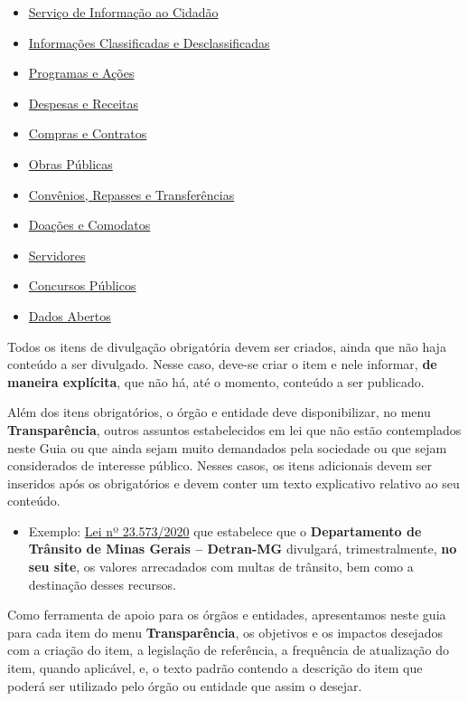 \documentclass[
]{book}
\providecommand{\tightlist}{%
  \setlength{\itemsep}{0pt}\setlength{\parskip}{0pt}}
\begin{document}
\begin{itemize}
\tightlist
\item
  \href{servico-informacao.html}{Serviço de Informação ao Cidadão}
\item
  \href{informacoes-classificadas.html}{Informações Classificadas e Desclassificadas}
\item
  \href{programas-acoes.html}{Programas e Ações}
\item
  \href{despesas-receitas.html}{Despesas e Receitas}
\item
  \href{compras-contratos.html}{Compras e Contratos}
\item
  \href{obras-publicas.html}{Obras Públicas}
\item
  \href{convenios-repasses.html}{Convênios, Repasses e Transferências}
\item
  \href{doacoes.html}{Doações e Comodatos}
\item
  \href{servidores.html}{Servidores}
\item
  \href{concursos-publicos.html}{Concursos Públicos}
\item
  \href{dados-abertos.html}{Dados Abertos}
\end{itemize}

Todos os itens de divulgação obrigatória devem ser criados, ainda que não haja conteúdo a ser divulgado. Nesse caso, deve-se criar o item e nele informar, \textbf{de maneira explícita}, que não há, até o momento, conteúdo a ser publicado.

Além dos itens obrigatórios, o órgão e entidade deve disponibilizar, no menu \textbf{Transparência}, outros assuntos estabelecidos em lei que não estão contemplados neste Guia ou que ainda sejam muito demandados pela sociedade ou que sejam considerados de interesse público. Nesses casos, os itens adicionais devem ser inseridos após os obrigatórios e devem conter um texto explicativo relativo ao seu conteúdo.

\begin{itemize}
\tightlist
\item
  Exemplo: \href{https://www.almg.gov.br/consulte/legislacao/completa/completa.html?tipo=LEI\&num=23573\&comp=\&ano=2020}{Lei nº 23.573/2020} que estabelece que o \textbf{Departamento de Trânsito de Minas Gerais -- Detran-MG} divulgará, trimestralmente, \textbf{no seu site}, os valores arrecadados com multas de trânsito, bem como a destinação desses recursos.
\end{itemize}

Como ferramenta de apoio para os órgãos e entidades, apresentamos neste guia para cada item do menu \textbf{Transparência}, os objetivos e os impactos desejados com a criação do item, a legislação de referência, a frequência de atualização do item, quando aplicável, e, o texto padrão contendo a descrição do item que poderá ser utilizado pelo órgão ou entidade que assim o desejar.
\end{document}
